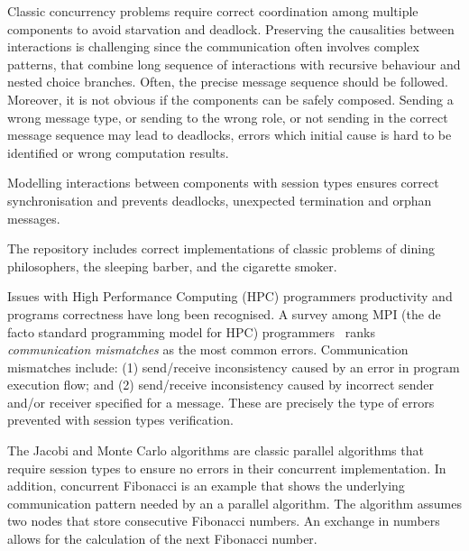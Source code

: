 Classic concurrency problems require correct coordination
among multiple components to avoid starvation and deadlock.
Preserving the causalities between interactions is
challenging since the communication often involves complex patterns,
that combine long sequence of interactions with recursive behaviour
and nested choice branches.
Often, the precise message sequence should be followed.
Moreover, it is not obvious if the components can be safely composed.
Sending a wrong message type, or sending to the wrong role,
or not sending in the correct message sequence may lead to deadlocks,
errors which initial cause is hard to be identified or wrong computation results.


Modelling interactions between components with session types ensures
correct synchronisation and prevents deadlocks,
unexpected termination and orphan messages.

The repository includes correct implementations of classic
problems of dining philosophers, the sleeping barber, and
the cigarette smoker.




Issues with High Performance Computing (HPC)
programmers productivity and programs correctness
have long been recognised.
A survey among MPI (the de facto standard programming model for HPC)
programmers~\cite{MPIErrors} ranks
\textit{communication mismatches} as the most common errors.
Communication mismatches include:
(1) send/receive inconsistency caused by an error in
program execution flow; and
(2) send/receive inconsistency caused by incorrect
sender and/or receiver specified for a message.
These are precisely the type of errors prevented with
session types verification.

The Jacobi and Monte Carlo algorithms are classic parallel algorithms
that require session types to ensure no errors in their
concurrent implementation.
%
In addition, concurrent Fibonacci is an
example that shows the underlying communication
pattern needed by an a parallel algorithm.
The algorithm assumes two nodes that store
consecutive Fibonacci numbers. An exchange
in numbers allows for the calculation of the
next Fibonacci number.



